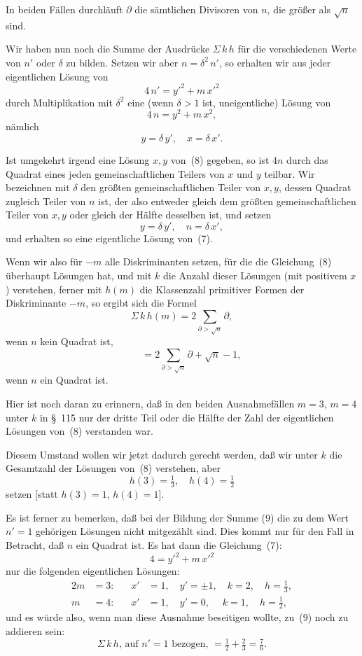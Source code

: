 \documentclass[12pt,a4paper]{article}
\theoremstyle{weber}
\begin{document}
In beiden Fällen durchläuft $\partial$ die sämtlichen Divisoren von $n$, die größer als $\sqrt{n}$ sind.

Wir haben nun noch die Summe der Ausdrücke $\Sigma\,k\,h$ für die verschiedenen Werte von $n'$ oder $\delta$ zu bilden. Setzen wir aber $n = \delta^2\,n'$, so erhalten wir aus jeder eigentlichen Lösung von
\begin{equation}
4\,n' = y'^2 + m\,x'^2
\end{equation}
durch Multiplikation mit $\delta^2$ eine (wenn $\delta > 1$ ist, uneigentliche) Lösung von
\begin{equation}
4\,n = y^2 + m\,x^2,
\end{equation}
nämlich
\[
y = \delta\,y', \quad x = \delta\,x'.
\]

Ist umgekehrt irgend eine Lösung $x, y$ von~(8) gegeben, so ist $4n$ durch das Quadrat eines jeden gemeinschaftlichen Teilers von $x$ und $y$ teilbar. Wir bezeichnen mit $\delta$ den größten gemeinschaftlichen Teiler von $x, y$, dessen Quadrat zugleich Teiler von $n$ ist, der also entweder gleich dem größten gemeinschaftlichen Teiler von $x, y$ oder gleich der Hälfte desselben ist, und setzen
\[
y = \delta\,y', \quad n = \delta\,x',
\]
und erhalten so eine eigentliche Lösung von~(7).

Wenn wir also für $-m$ alle Diskriminanten setzen, für die die Gleichung~(8) überhaupt Lösungen hat, und mit $k$ die Anzahl dieser Lösungen (mit positivem $x$) verstehen, ferner mit $h(m)$ die Klassenzahl primitiver Formen der Diskriminante $-m$, so ergibt sich die Formel
\begin{equation}
\Sigma\,k\,h(m) = 2\sum_{\partial > \sqrt{n}} \partial,
\end{equation}
wenn $n$ kein Quadrat ist,
\[
\qquad = 2\sum_{\partial > \sqrt{n}} \partial + \sqrt{n} - 1,
\]
wenn $n$ ein Quadrat ist.

Hier ist noch daran zu erinnern, daß in den beiden Ausnahmefällen $m = 3$, $m = 4$ unter $k$ in \S~115 nur der dritte Teil oder die Hälfte der Zahl der eigentlichen Lösungen von~(8) verstanden war.

Diesem Umstand wollen wir jetzt dadurch gerecht werden, daß wir unter $k$ die Gesamtzahl der Lösungen von~(8) verstehen, aber
\[
h(3) = \tfrac{1}{3}, \quad h(4) = \tfrac{1}{2}
\]
setzen [statt $h(3) = 1$, $h(4) = 1$].

Es ist ferner zu bemerken, daß bei der Bildung der Summe (9) die zu dem Wert $n' = 1$ gehörigen Lösungen nicht mitgezählt sind. Dies kommt nur für den Fall in Betracht, daß $n$ ein Quadrat ist. Es hat dann die Gleichung~(7):
\[
4 = y'^2 + m\,x'^2
\]
nur die folgenden eigentlichen Lösungen:
\begin{alignat*}{2}
m &= 3\text{:}\quad & x' &= 1,\quad y' = \pm 1,\quad k = 2,\quad h = \tfrac{1}{3},\\
m &= 4\text{:}\quad & x' &= 1,\quad y' = 0,\quad\; k = 1,\quad h = \tfrac{1}{2},
\end{alignat*}
und es würde also, wenn man diese Ausnahme beseitigen wollte, zu~(9) noch zu addieren sein:
\[
\Sigma\,k\,h\text{, auf } n' = 1 \text{ bezogen, } = \tfrac{1}{2} + \tfrac{2}{3} = \tfrac{7}{6}.
\]
\end{document}
